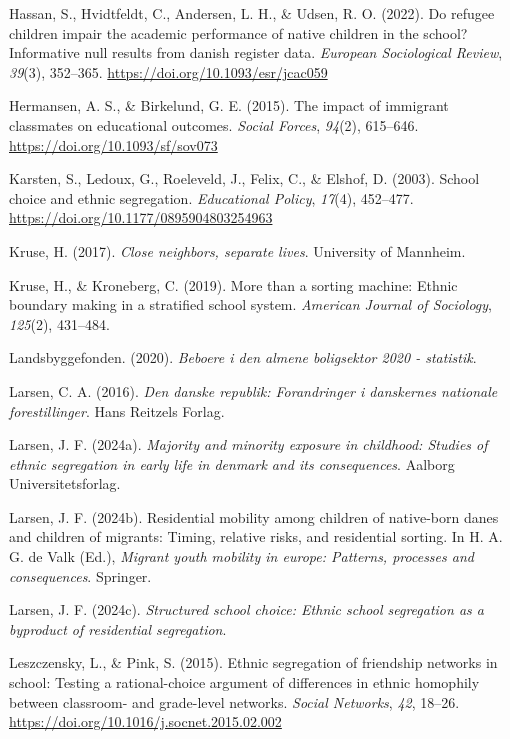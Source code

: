 \documentclass[
]{book}
\newlength{\cslhangindent}
\newenvironment{CSLReferences}[2] %
 {\begin{list}{}{%
  \setlength{\itemindent}{0pt}
  \setlength{\leftmargin}{0pt}
  \setlength{\parsep}{0pt}
  \ifodd #1
   \setlength{\leftmargin}{\cslhangindent}
   \setlength{\itemindent}{-1\cslhangindent}
  \fi
  \setlength{\itemsep}{#2\baselineskip}}}
 {\end{list}}
\begin{document}
\begin{CSLReferences}{1}{0}
Hassan, S., Hvidtfeldt, C., Andersen, L. H., \& Udsen, R. O. (2022). Do refugee children impair the academic performance of native children in the school? Informative null results from danish register data. \emph{European Sociological Review}, \emph{39}(3), 352--365. \url{https://doi.org/10.1093/esr/jcac059}

Hermansen, A. S., \& Birkelund, G. E. (2015). The impact of immigrant classmates on educational outcomes. \emph{Social Forces}, \emph{94}(2), 615--646. \url{https://doi.org/10.1093/sf/sov073}

Karsten, S., Ledoux, G., Roeleveld, J., Felix, C., \& Elshof, D. (2003). School choice and ethnic segregation. \emph{Educational Policy}, \emph{17}(4), 452--477. \url{https://doi.org/10.1177/0895904803254963}

Kruse, H. (2017). \emph{Close neighbors, separate lives}. University of Mannheim.

Kruse, H., \& Kroneberg, C. (2019). More than a sorting machine: Ethnic boundary making in a stratified school system. \emph{American Journal of Sociology}, \emph{125}(2), 431--484.

Landsbyggefonden. (2020). \emph{Beboere i den almene boligsektor 2020 - statistik}.

Larsen, C. A. (2016). \emph{Den danske republik: Forandringer i danskernes nationale forestillinger}. Hans Reitzels Forlag.

Larsen, J. F. (2024a). \emph{Majority and minority exposure in childhood: Studies of ethnic segregation in early life in denmark and its consequences}. Aalborg Universitetsforlag.

Larsen, J. F. (2024b). Residential mobility among children of native-born danes and children of migrants: Timing, relative risks, and residential sorting. In H. A. G. de Valk (Ed.), \emph{Migrant youth mobility in europe: Patterns, processes and consequences}. Springer.

Larsen, J. F. (2024c). \emph{Structured school choice: Ethnic school segregation as a byproduct of residential segregation}.

Leszczensky, L., \& Pink, S. (2015). Ethnic segregation of friendship networks in school: Testing a rational-choice argument of differences in ethnic homophily between classroom- and grade-level networks. \emph{Social Networks}, \emph{42}, 18--26. \url{https://doi.org/10.1016/j.socnet.2015.02.002}


\end{CSLReferences}
\end{document}
